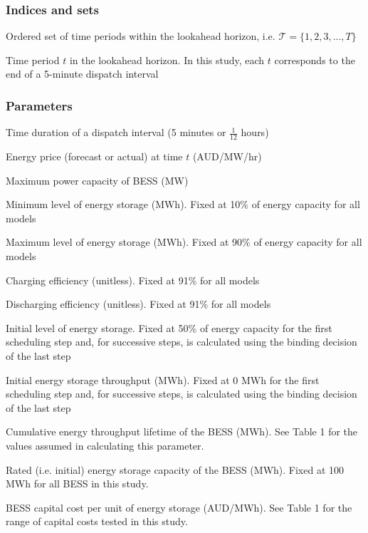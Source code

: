 \documentclass[12pt,a4paper,]{report}
\begin{document}
\hypertarget{indices-and-sets-1}{%
\subsubsection{Indices and sets}\label{indices-and-sets-1}}

\begin{description}[leftmargin=8em,style=nextline]
  \item[$\mathcal{T}$] Ordered set of time periods within the lookahead horizon, i.e. $\mathcal{T} = \{1, 2, 3, ..., T\}$
  \item[$t \in \mathcal{T}$] Time period $t$ in the lookahead horizon. In this study, each $t$ corresponds to the end of a 5-minute dispatch interval
\end{description}

\hypertarget{parameters}{%
\subsubsection{Parameters}\label{parameters}}

\begin{description}[leftmargin=8em,style=nextline]
  \item[$\tau$] Time duration of a dispatch interval (5 minutes or $\frac{1}{12}$ hours)
  \item[$\lambda_t$] Energy price (forecast or actual) at time $t$ (AUD/MW/hr)
  \item[$\bar{p}$] Maximum power capacity of BESS (MW)
  \item[$\underline{e}$] Minimum level of energy storage (MWh). Fixed at 10\% of energy capacity for all models
  \item[$\bar{e}$] Maximum level of energy storage (MWh). Fixed at 90\% of energy capacity for all models
  \item[$\eta_{\textrm{charge}}$] Charging efficiency (unitless). Fixed at 91\% for all models
  \item[$\eta_{\textrm{discharge}}$] Discharging efficiency (unitless). Fixed at 91\% for all models
  \item[$e_0$] Initial level of energy storage. Fixed at 50\% of energy capacity for the first scheduling step and, for successive steps, is calculated using the binding decision of the last step
  \item[$d_0$] Initial energy storage throughput (MWh). Fixed at 0 MWh for the first scheduling step and, for successive steps, is calculated using the binding decision of the last step
  \item[$d_{\textrm{lifetime}}$] Cumulative energy throughput lifetime of the BESS (MWh). See Table 1 for the values assumed in calculating this parameter.
  \item[$e_{\textrm{rated}}$] Rated (i.e. initial) energy storage capacity of the BESS (MWh). Fixed at 100 MWh for all BESS in this study.
  \item[$c_{\textrm{capital}}$] BESS capital cost per unit of energy storage (AUD/MWh). See Table 1 for the range of capital costs tested in this study.
\end{description}
\end{document}
